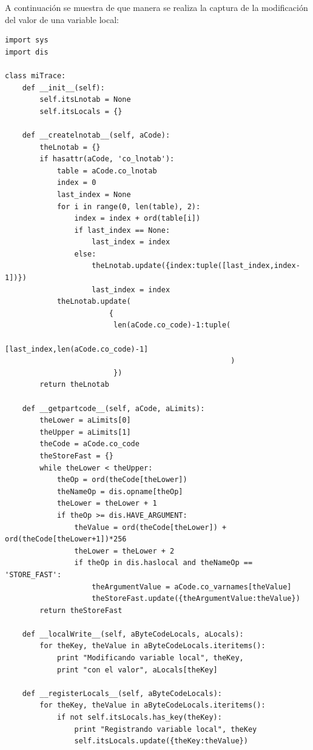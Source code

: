\documentclass[12pt,legalpaper]{report}
\begin{document}
A continuación se muestra de que manera se realiza la captura de la modificación del valor de una variable local:

\begin{singlespace}
\begin{lstlisting}[style=Python]
import sys
import dis

class miTrace:
    def __init__(self):
        self.itsLnotab = None
        self.itsLocals = {}

    def __createlnotab__(self, aCode):
        theLnotab = {}
        if hasattr(aCode, 'co_lnotab'):
            table = aCode.co_lnotab
            index = 0
            last_index = None
            for i in range(0, len(table), 2):
                index = index + ord(table[i])
                if last_index == None:
                    last_index = index
                else:
                    theLnotab.update({index:tuple([last_index,index-1])})                
                    last_index = index
            theLnotab.update(
                        {
                         len(aCode.co_code)-1:tuple(
                                            [last_index,len(aCode.co_code)-1]
                                                    )
                         })                
        return theLnotab 
    
    def __getpartcode__(self, aCode, aLimits):
        theLower = aLimits[0]
        theUpper = aLimits[1]
        theCode = aCode.co_code
        theStoreFast = {}    
        while theLower < theUpper:
            theOp = ord(theCode[theLower])
            theNameOp = dis.opname[theOp]
            theLower = theLower + 1
            if theOp >= dis.HAVE_ARGUMENT:
                theValue = ord(theCode[theLower]) + ord(theCode[theLower+1])*256
                theLower = theLower + 2
                if theOp in dis.haslocal and theNameOp == 'STORE_FAST':
                    theArgumentValue = aCode.co_varnames[theValue]
                    theStoreFast.update({theArgumentValue:theValue})
        return theStoreFast
    
    def __localWrite__(self, aByteCodeLocals, aLocals):
        for theKey, theValue in aByteCodeLocals.iteritems():
            print "Modificando variable local", theKey,
            print "con el valor", aLocals[theKey]

    def __registerLocals__(self, aByteCodeLocals):
        for theKey, theValue in aByteCodeLocals.iteritems():
            if not self.itsLocals.has_key(theKey):
                print "Registrando variable local", theKey
                self.itsLocals.update({theKey:theValue})


\end{lstlisting}
\end{singlespace}
\end{document}
